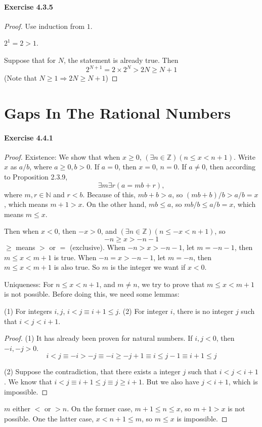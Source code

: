 \paragraph{Exercise 4.3.5} \label{exercise4.3.5}
\begin{proof}
Use induction from $1$.

$2^1 = 2 >1$.

Suppose that for $N$, the statement is already true. Then
\[
2^{N+1} = 2\times 2^N > 2N \geq N+1
\]
(Note that $N\geq 1 \Longrightarrow 2N \geq N+1$)
\end{proof}

\section{Gaps In The Rational Numbers}
\paragraph{Exercise 4.4.1} \label{exercise4.4.1}
\begin{proof}
Existence: We show that when $x \geq 0$, $(\exists n \in \mathbb{Z})(n \leq x < n+1)$. Write $x$ as $a/b$, 
where $a \geq 0,b>0$. If $a= 0$, then $x=0$, $n=0$. If $a\neq 0$, then according to Proposition 2.3.9, 
\[
\exists m \exists r(a = mb+r),
\]
where $m,r \in \mathbb{N}$ and $r < b$. Because of this, $mb+b >a$, so $(mb+b)/b>a/b=x$, which means $m+1>x$. 
On the other hand, $mb \leq a$, so $mb/b \leq a/b =x$, which means $m \leq x$.

Then when $x<0$, then $-x>0$, and $(\exists n \in \mathbb{Z})(n \leq -x < n+1)$, so 
\[
-n \geq x > -n -1
\]
$\geq$ means $>$ or $=$ (exclusive). When $-n > x >-n-1$, let $m=-n-1$, then $m \leq x < m+1$ is true. When 
$-n =x > -n-1$, let $m=-n$, then $m \leq x < m+1$ is also true. So $m$ is the integer we want if $x<0$.

Uniqueness:
For $n \leq x < n+1$, and $m \neq n$, we try to prove that $m \leq x<m+1$ is not possible. Before doing this, 
we need some lemmas:
\begin{lem}
(1) For integers $i,j$, $i<j \equiv i+1\leq j$.
(2) For integer $i$, there is no integer $j$ such that $i<j<i+1$.
\end{lem}
\begin{proof}
(1) It has already been proven for natural numbers. If $i,j<0$, then $-i,-j>0$.
\[
i<j \equiv -i>-j \equiv -i \geq -j+1 \equiv i \leq j-1 \equiv i+1 \leq j
\]

(2)
Suppose the contradiction, that there exists a integer $j$ such that $i<j<i+1$. We know that 
$i<j \equiv i+1 \leq j \equiv j \geq i+1$. But we also have $j<i+1$, which is impossible.
\end{proof}

$m$ either $<$ or $>n$. On the former case, $m+1\leq n\leq x$, so $m+1>x$ is not possible. One the latter case, 
$x<n+1\leq m$, so $m \leq x$ is impossible.
\end{proof}

